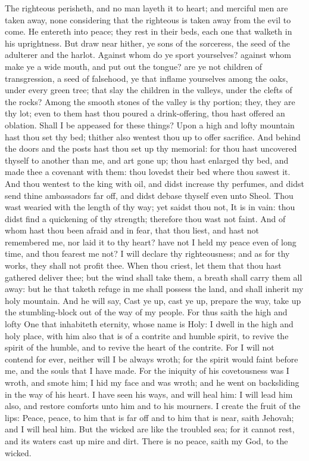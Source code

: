 The righteous perisheth, and no man layeth it to heart; and merciful men are taken away, none considering that the righteous is taken away from the evil to come. He entereth into peace; they rest in their beds, each one that walketh in his uprightness.  But draw near hither, ye sons of the sorceress, the seed of the adulterer and the harlot. Against whom do ye sport yourselves? against whom make ye a wide mouth, and put out the tongue? are ye not children of transgression, a seed of falsehood, ye that inflame yourselves among the oaks, under every green tree; that slay the children in the valleys, under the clefts of the rocks? Among the smooth stones of the valley is thy portion; they, they are thy lot; even to them hast thou poured a drink-offering, thou hast offered an oblation. Shall I be appeased for these things? Upon a high and lofty mountain hast thou set thy bed; thither also wentest thou up to offer sacrifice. And behind the doors and the posts hast thou set up thy memorial: for thou hast uncovered thyself to another than me, and art gone up; thou hast enlarged thy bed, and made thee a covenant with them: thou lovedst their bed where thou sawest it. And thou wentest to the king with oil, and didst increase thy perfumes, and didst send thine ambassadors far off, and didst debase thyself even unto Sheol. Thou wast wearied with the length of thy way; yet saidst thou not, It is in vain: thou didst find a quickening of thy strength; therefore thou wast not faint.  And of whom hast thou been afraid and in fear, that thou liest, and hast not remembered me, nor laid it to thy heart? have not I held my peace even of long time, and thou fearest me not? I will declare thy righteousness; and as for thy works, they shall not profit thee. When thou criest, let them that thou hast gathered deliver thee; but the wind shall take them, a breath shall carry them all away: but he that taketh refuge in me shall possess the land, and shall inherit my holy mountain.  And he will say, Cast ye up, cast ye up, prepare the way, take up the stumbling-block out of the way of my people. For thus saith the high and lofty One that inhabiteth eternity, whose name is Holy: I dwell in the high and holy place, with him also that is of a contrite and humble spirit, to revive the spirit of the humble, and to revive the heart of the contrite. For I will not contend for ever, neither will I be always wroth; for the spirit would faint before me, and the souls that I have made. For the iniquity of his covetousness was I wroth, and smote him; I hid my face and was wroth; and he went on backsliding in the way of his heart. I have seen his ways, and will heal him: I will lead him also, and restore comforts unto him and to his mourners. I create the fruit of the lips: Peace, peace, to him that is far off and to him that is near, saith Jehovah; and I will heal him. But the wicked are like the troubled sea; for it cannot rest, and its waters cast up mire and dirt. There is no peace, saith my God, to the wicked. 

